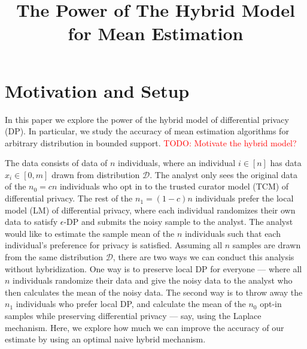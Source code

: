 \documentclass[sigconf]{acmart}
\title{The Power of The Hybrid Model for Mean Estimation}
\newcommand{\todo}[1]{\textcolor{red}{TODO: {#1}}}
\theoremstyle{plain}
\begin{document}
\maketitle

\section{Motivation and Setup}

In this paper we explore the power of the hybrid model \cite{blender} of differential privacy (DP). In particular, we study the accuracy of mean estimation algorithms for arbitrary distribution in bounded support. \todo{Motivate the hybrid model?}

The data consists of data of $n$ individuals, where an individual $i \in [n]$ has data $x_i \in [0, m]$ drawn from distribution $\mathcal{D}$. The analyst only sees the original data of the $n_0 = c n$ individuals who opt in to the trusted curator model (TCM) of differential privacy. The rest of the $n_1 = (1-c) n$ individuals prefer the local model (LM) of differential privacy, where each individual randomizes their own data to satisfy $\epsilon$-DP and submits the noisy sample to the analyst. The analyst would like to estimate the sample mean of the $n$ individuals such that each individual's preference for privacy is satisfied. Assuming all $n$ samples are drawn from the same distribution $\mathcal{D}$, there are two ways we can conduct this analysis without hybridization. One way is to preserve local DP for everyone — where all $n$ individuals randomize their data and give the noisy data to the analyst who then calculates the mean of the noisy data. The second way is to throw away the $n_1$ individuals who prefer local DP, and calculate the mean of the $n_0$ opt-in samples while preserving differential privacy — say, using the Laplace mechanism. Here, we explore how much we can improve the accuracy of our estimate by using an optimal naive hybrid mechanism. 
\end{document}
